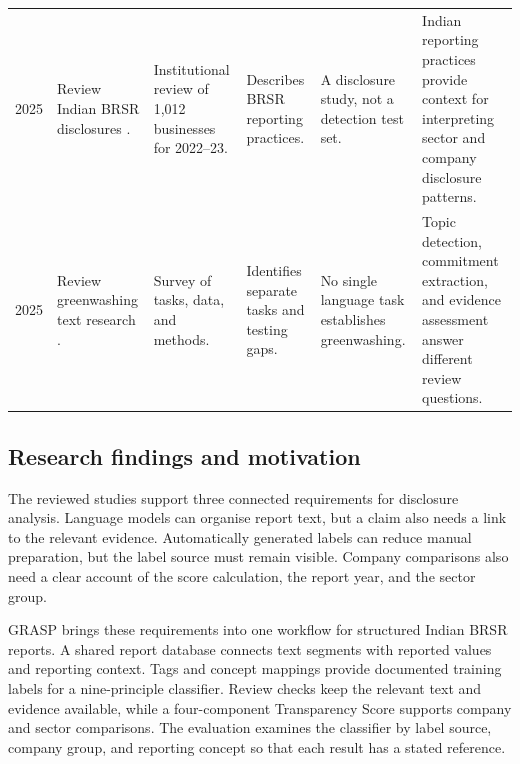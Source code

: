 {\begin{longtable}{@{}L{0.85cm}L{2.35cm}L{2.65cm}L{2.65cm}L{2.65cm}L{2.65cm}@{}}
2025 & Review Indian BRSR disclosures \cite{garg2025}. & Institutional review of 1,012 businesses for 2022--23. & Describes BRSR reporting practices. & A disclosure study, not a detection test set. & Indian reporting practices provide context for interpreting sector and company disclosure patterns.\\
2025 & Review greenwashing text research \cite{calamai2025}. & Survey of tasks, data, and methods. & Identifies separate tasks and testing gaps. & No single language task establishes greenwashing. & Topic detection, commitment extraction, and evidence assessment answer different review questions.\\
\end{longtable}}

\subsection{Research findings and motivation}

The reviewed studies support three connected requirements for disclosure analysis. Language models can organise report text, but a claim also needs a link to the relevant evidence. Automatically generated labels can reduce manual preparation, but the label source must remain visible. Company comparisons also need a clear account of the score calculation, the report year, and the sector group.

GRASP brings these requirements into one workflow for structured Indian BRSR reports. A shared report database connects text segments with reported values and reporting context. Tags and concept mappings provide documented training labels for a nine-principle classifier. Review checks keep the relevant text and evidence available, while a four-component Transparency Score supports company and sector comparisons. The evaluation examines the classifier by label source, company group, and reporting concept so that each result has a stated reference.
